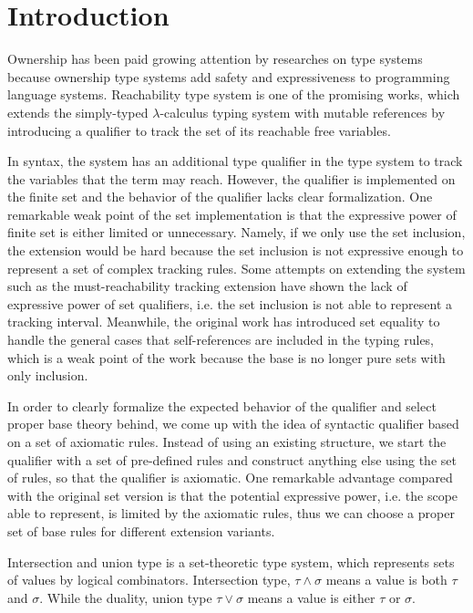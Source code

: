 \section{Introduction}\label{sec:introduction}

Ownership has been paid growing attention by researches on type systems because ownership type systems add safety and expressiveness to programming language systems. Reachability type system \langstar \cite{reachability-paper} is one of the promising works, which extends the simply-typed $\lambda$-calculus typing system with mutable references by introducing a qualifier to track the set of its reachable free variables. 

In syntax, the \langstar system has an additional type qualifier in the type system to track the variables that the term may reach. However, the qualifier is implemented on the finite set and the behavior of the qualifier lacks  clear formalization. One remarkable weak point of the set implementation is that the expressive power of finite set is either limited or unnecessary. Namely, if we only use the set inclusion, the extension would be hard because the set inclusion is not expressive enough to represent a set of complex tracking rules. Some attempts on extending the \langstar system such as the must-reachability tracking extension \cite{must-reachability} have shown the lack of expressive power of set qualifiers, i.e. the set inclusion is not able to represent a tracking interval. Meanwhile, the original \langstar work has introduced set equality to handle the general cases that self-references are included in the typing rules, which is a weak point of the work because the base is no longer pure sets with only inclusion. 

In order to clearly formalize the expected behavior of the qualifier and select proper base theory behind, we come up with the idea of syntactic qualifier based on a set of axiomatic rules. Instead of using an existing structure, we start the qualifier with a set of pre-defined rules and construct anything else using the set of rules, so that the qualifier is axiomatic. One remarkable advantage compared with the original set version is that the potential expressive power, i.e. the scope able to represent, is limited by the axiomatic rules, thus we can choose a proper set of base rules for different extension variants. 

Intersection and union type \cite{intersection-union-types} is a set-theoretic type system, which represents sets of values by logical combinators. Intersection type, \texttt{$\tau \land \sigma$} means a value is both \texttt{$\tau$} and \texttt{$\sigma$}. While the duality, union type \texttt{$\tau \lor \sigma$} means a value is either \texttt{$\tau$} or \texttt{$\sigma$}.


